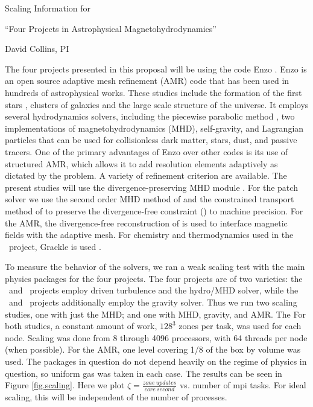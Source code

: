 \documentclass[11pt]{NSF}  %
\begin{document}
\begin{centering}
\begin{LARGE}
Scaling Information for 

``Four Projects in Astrophysical Magnetohydrodynamics''
\end{LARGE}

David Collins, PI

\end{centering}


\pagestyle{plain}

The four projects presented in this proposal will be using the code Enzo
\citep{Collins10, Bryan14}.
Enzo  is an open source adaptive mesh refinement (AMR) code that
has been used in hundreds of astrophysical works.  These studies include the
formation of the first stars \citep{Abel02}, clusters of galaxies \citep{Xu11}
and the large scale structure of the universe.  It employs several hydrodynamics
solvers, including the piecewise parabolic method  \citep[PPM,][]{Colella84}, two implementations of
magnetohydrodynamics (MHD), self-gravity, and Lagrangian particles that can be used
for collisionless dark matter, stars, dust, and passive tracers.  One of the
primary advantages of Enzo over other codes is its use of structured AMR, which
allows it to add resolution elements adaptively as dictated by the problem.  A
variety of refinement criterion are available.   The present studies will use
the divergence-preserving MHD module \citep{Collins10}.  For the patch solver we
use the
second order MHD method of \citet{Li08a} and the constrained transport method of
\citet{Gardiner05} to preserve the divergence-free constraint (\divbo) to
machine precision.  For the AMR, the divergence-free reconstruction of \citet{Balsara01}
is used to interface magnetic fields with the adaptive mesh.  For chemistry and
 thermodynamics used in the \nameGalaxies\ project, Grackle is used
\citep{Smith17}.  

To measure the behavior of the solvers, we ran a weak scaling test with the main
physics packages for the four projects.  The four projects are of two varieties:
the \nameCMB\ and \nameTurbulence\ projects employ driven turbulence and the
hydro/MHD solver, while the \nameCores\ and \nameGalaxies\ projects additionally
employ the gravity solver.  Thus we run two scaling studies, one with just the
MHD; and one with MHD, gravity, and AMR.  The For both studies,
a constant amount of
work, $128^3$ zones per task, was used for each node. 
Scaling was done from 8 through 4096
processors, with 64 threads per node (when possible).
For the AMR, one level covering 1/8 of the box by volume was used.
The packages in question do not depend heavily on the regime of
physics in question, so uniform gas was taken in each case.  The results can be
seen in Figure \ref{fig.scaling}.  Here we plot $\zeta = \frac{zone\
updates}{core\ second}$ vs. number of mpi tasks.
For ideal scaling, this will be independent of the number of processes.
\end{document}
